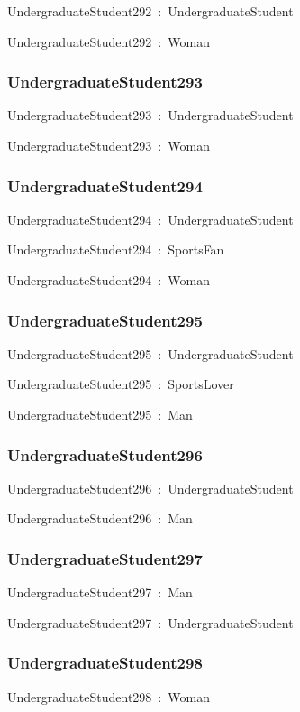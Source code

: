 \documentclass{article}
\begin{document}
UndergraduateStudent292~:~UndergraduateStudent

UndergraduateStudent292~:~Woman

\subsubsection*{UndergraduateStudent293}

UndergraduateStudent293~:~UndergraduateStudent

UndergraduateStudent293~:~Woman

\subsubsection*{UndergraduateStudent294}

UndergraduateStudent294~:~UndergraduateStudent

UndergraduateStudent294~:~SportsFan

UndergraduateStudent294~:~Woman

\subsubsection*{UndergraduateStudent295}

UndergraduateStudent295~:~UndergraduateStudent

UndergraduateStudent295~:~SportsLover

UndergraduateStudent295~:~Man

\subsubsection*{UndergraduateStudent296}

UndergraduateStudent296~:~UndergraduateStudent

UndergraduateStudent296~:~Man

\subsubsection*{UndergraduateStudent297}

UndergraduateStudent297~:~Man

UndergraduateStudent297~:~UndergraduateStudent

\subsubsection*{UndergraduateStudent298}

UndergraduateStudent298~:~Woman
\end{document}

